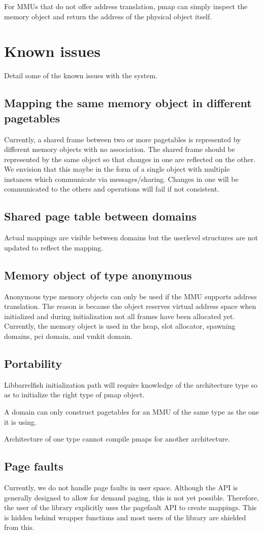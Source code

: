 \documentclass[a4paper,twoside]{report} %
\begin{document}
For MMUs that do not offer address translation,
pmap can simply inspect the memory object and return the address of the physical object itself.

\chapter{Known issues}
Detail some of the known issues with the system.

\section{Mapping the same memory object in different pagetables}
Currently, a shared frame between two or more pagetables is
represented by different memory objects with no association.
The shared frame should be represented by the same object so that changes in one are reflected on the other.
We envision that this maybe in the form of a single object
with multiple instances which communicate via messages/sharing.
Changes in one will be communicated to the others and operations will fail if not consistent.

\section{Shared page table between domains}
Actual mappings are visible between domains
but the userlevel structures are not updated to reflect the mapping.

\section{Memory object of type anonymous}
Anonymous type memory objects can only be used if the MMU supports address translation.
The reason is because the object reserves virtual address space when initialized
and during initialization not all frames have been allocated yet.
Currently, the memory object is used in the heap, slot allocator, spawning domains, pci domain, and vmkit domain.

\section{Portability}
Libbarrelfish initialization path will require knowledge of the architecture type
so as to initialize the right type of pmap object.

A domain can only construct pagetables for an MMU of the same type as the one it is using.

Architecture of one type cannot compile pmaps for another architecture.

\section{Page faults}
Currently, we do not handle page faults in user space.
Although the API is generally designed to allow for demand paging, this is not yet possible.
Therefore, the user of the library explicitly uses the pagefault API to create mappings.
This is hidden behind wrapper functions and most users of the library are shielded from this.
\end{document}
